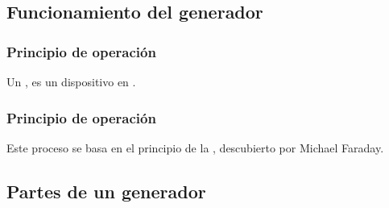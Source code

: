 \documentclass[14pt]{beamer}
\begin{document}
\subsection{Funcionamiento del generador}

\begin{frame}
\frametitle{Principio de operación}
Un , \pause es un dispositivo  en .
\end{frame}
\begin{frame}
\frametitle{Principio de operación}
Este proceso se basa en el principio de la , descubierto por Michael Faraday.
\end{frame}

\subsection{Partes de un generador}
\end{document}

